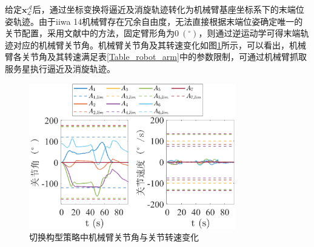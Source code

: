 \documentclass[lang=chs, degree=master, blindreview=false, winfonts=true]{yanputhesis}
\begin{document}
给定${{\boldsymbol{x}}_\mathcal{L}^{\mathcal{A}}}$后，通过坐标变换将逼近及消旋轨迹转化为机械臂基座坐标系下的末端位姿轨迹。由于iiwa 14机械臂存在冗余自由度，无法直接根据末端位姿确定唯一的关节配置，采用文献中的方法，固定臂形角为$0\ (\mathrm{^\circ})$，则通过逆运动学可得末端轨迹对应的机械臂关节角。机械臂关节角及其转速变化如图\ref{fig:arm_angle}所示，可以看出，机械臂各关节角及其转速满足表\ref{Table_robot_arm}中的参数限制，可通过机械臂抓取服务星执行逼近及消旋轨迹。
\begin{figure}[htbp]
	\centering
	\includegraphics[width = 3.55in]{picture/arm_angle.eps}
	\caption{切换构型策略中机械臂关节角与关节转速变化}
	\label{fig:arm_angle}
\end{figure}
\end{document}
